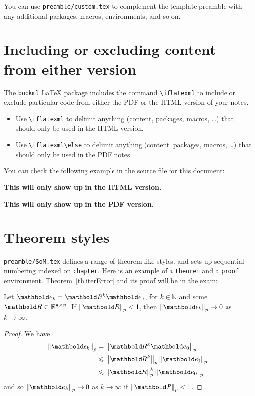 You can use \verb|preamble/custom.tex| to complement the template preamble with any additional packages, macros, environments, and so on.


\section{Including or excluding content from either version}
\label{demo:ifpdf}

The \verb|bookml| \LaTeX{} package includes the command \verb|\iflatexml|  to include or exclude particular code from either the PDF or the HTML version of your notes.

\begin{itemize}
    \item Use \verb|\iflatexml| to delimit anything (content, packages, macros, \ldots) that should only be used in the HTML version.
    \item Use \verb|\iflatexml\else| to delimit anything (content, packages, macros, \ldots) that should only be used in the PDF notes.
\end{itemize}

You can check the following example in the source file for this document:

\iflatexml
  \textbf{This will only show up in the HTML version.}
\fi

\iflatexml
\else
  \textbf{This will only show up in the PDF version.}
\fi



\section{Theorem styles}
\label{demo:thm}

\verb|preamble/SoM.tex| defines a range of theorem-like styles, and sets up sequential numbering indexed on \verb|chapter|. Here is an example of a \verb|theorem| and a \verb|proof| environment.
Theorem~\ref{th:iterError} and its proof will be in the exam:

\begin{theorem}
  \label{th:iterError}
  Let $\vect{e}_k = \mat{R}^k \vect{e}_0$, for $k\in \mathbb{N}$ and some $\mat{R}\in \R^{n\times n}$. If $\norm{\mat{R}}_p < 1$, then \mbox{$\norm{\vect{e}_k}_p \to 0$} as $k \to \infty$.
\end{theorem}

\begin{proof}
  We have
  \begin{align*}
    \norm{\vect{e}_k}_p &= \norm{\mat{R}^k \vect{e}_0}_p \\
    &\leqslant \norm{\mat{R}^k}_p \norm{\vect{e}_0}_p \\
    &\leqslant \norm{\mat{R}}_p^k \norm{\vect{e}_0}_p 
  \end{align*}
  and so $\norm{\vect{e}_k}_p \to 0$ as $k \to \infty$ if $\norm{\mat{R}}_p < 1$. \qedhere
\end{proof}

